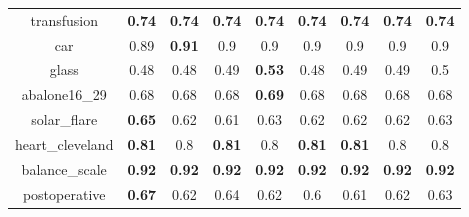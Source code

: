 \documentclass{article}%
\begin{document}
\begin{tabular}{c|cccccccc}
transfusion&\textbf{0.74}&\textbf{0.74}&\textbf{0.74}&\textbf{0.74}&\textbf{0.74}&\textbf{0.74}&\textbf{0.74}&\textbf{0.74}\\%

car&0.89&\textbf{0.91}&0.9&0.9&0.9&0.9&0.9&0.9\\%

glass&0.48&0.48&0.49&\textbf{0.53}&0.48&0.49&0.49&0.5\\%

abalone16\_29&0.68&0.68&0.68&\textbf{0.69}&0.68&0.68&0.68&0.68\\%

solar\_flare&\textbf{0.65}&0.62&0.61&0.63&0.62&0.62&0.62&0.63\\%

heart\_cleveland&\textbf{0.81}&0.8&\textbf{0.81}&0.8&\textbf{0.81}&\textbf{0.81}&0.8&0.8\\%

balance\_scale&\textbf{0.92}&\textbf{0.92}&\textbf{0.92}&\textbf{0.92}&\textbf{0.92}&\textbf{0.92}&\textbf{0.92}&\textbf{0.92}\\%

postoperative&\textbf{0.67}&0.62&0.64&0.62&0.6&0.61&0.62&0.63\\%

\end{tabular}

%
\end{document}
